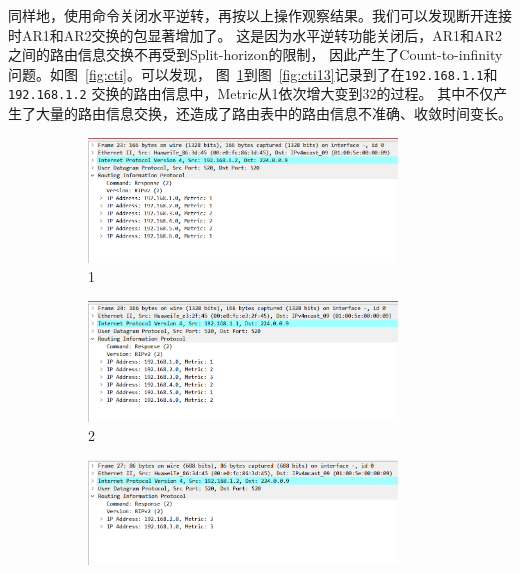 \documentclass[a4paper,twoside]{article}
\begin{document}
\begin{spacing}{1.2}
同样地，使用命令关闭水平逆转，再按以上操作观察结果。我们可以发现断开连接时AR1和AR2交换的包显著增加了。
这是因为水平逆转功能关闭后，AR1和AR2之间的路由信息交换不再受到Split-horizon的限制，
因此产生了Count-to-infinity问题。如图~\ref{fig:cti}。可以发现，
图~\ref{fig:cti1}到图~\ref{fig:cti13}记录到了在\texttt{192.168.1.1}和\texttt{192.168.1.2}
交换的路由信息中，Metric从1依次增大变到32的过程。
其中不仅产生了大量的路由信息交换，还造成了路由表中的路由信息不准确、收敛时间变长。

\begin{figure}[bp]
	\centering
	\caption{Count-to-infinity}
	\label{fig:cti}
	\begin{subfigure}{0.4\textwidth}
		\centering
		\includegraphics[width=0.9\textwidth]{1.png}
		\caption{1}
		\label{fig:cti1}
	\end{subfigure}
	\begin{subfigure}{0.4\textwidth}
		\centering
		\includegraphics[width=0.9\textwidth]{2.png}
		\caption{2}
		\label{fig:cti2}
	\end{subfigure}
	\begin{subfigure}{0.4\textwidth}
		\centering
		\includegraphics[width=0.9\textwidth]{3.png}

\end{subfigure}
\end{figure}
\end{spacing}
\end{document}
